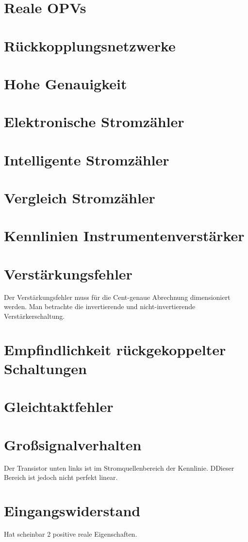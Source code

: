 \documentclass[a4paper]{article}
\begin{document}
\section*{Reale OPVs}
\section*{Rückkopplungsnetzwerke}
\section*{Hohe Genauigkeit}
\section*{Elektronische Stromzähler}
\section*{Intelligente Stromzähler}
\section*{Vergleich Stromzähler}
\section*{Kennlinien Instrumentenverstärker}
\section*{Verstärkungsfehler}
Der Verstärkungsfehler muss für die Cent-genaue Abrechnung dimensioniert werden.
Man betrachte die invertierende und nicht-invertierende Verstärkerschaltung.
\section*{Empfindlichkeit rückgekoppelter Schaltungen}
\section*{Gleichtaktfehler}
\section*{Großsignalverhalten}
Der Transistor unten links ist im Stromquellenbereich der Kennlinie. DDieser Bereich ist jedoch nicht perfekt linear.
\section*{Eingangswiderstand}
Hat scheinbar 2 positive reale Eigenschaften.
\end{document}
